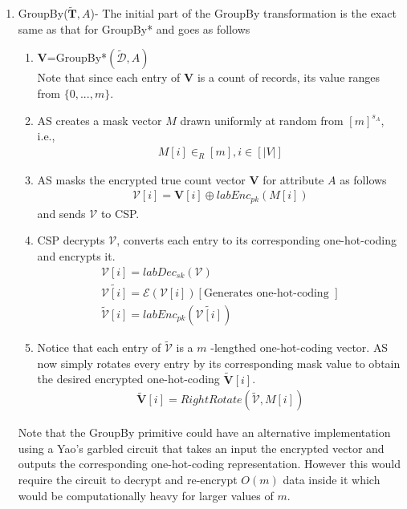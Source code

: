 \begin{enumerate}
\begin{enumerate}
\end{enumerate}
\item \textsf{GroupBy}($\mathbf{\tilde{T}},A$)- The initial part of the  \textsf{GroupBy} transformation is the exact same as that  for \textsf{GroupBy*} and goes as follows   \begin{enumerate}\item $\mathbf{V}$=\textsf{GroupBy*}$(\boldsymbol{\tilde{\mathcal{D}}},A)$ \\Note that since each entry of $\mathbf{V}$ is a count of records, its value ranges from $\{0,...,m\}$. \item \textsf{AS} creates a mask vector $M$ drawn uniformly at random from $[m]^{s_A}$, i.e.,  \begin{gather*} M[i] \in_R [m], i \in [|V|]\end{gather*} \item \textsf{AS} masks the encrypted true count vector $\mathbf{V}$ for attribute $A$ as follows \begin{gather*}\boldsymbol{\mathcal{V}}[i]= \mathbf{V}[i] \oplus labEnc_{pk}(M[i])\end{gather*} and sends $\boldsymbol{\mathcal{V}}$ to \textsf{CSP}.\item \textsf{CSP} decrypts $\boldsymbol{\mathcal{V}}$, converts each entry to its corresponding one-hot-coding and encrypts it. \begin{gather*}\mathcal{V}[i]=labDec_{sk}(\boldsymbol{\mathcal{V}})\\\tilde{\mathcal{V}[i]}=\mathcal{E}(\mathcal{V}[i])[\text{Generates one-hot-coding  }]\\\boldsymbol{\tilde{\mathcal{V}}}[i]=labEnc_{pk}(\tilde{\mathcal{V}[i]})\end{gather*}\item Notice that each entry of $\boldsymbol{\tilde{\mathcal{V}}}$ is a $m$ -lengthed one-hot-coding vector. \textsf{AS} now simply rotates every entry by its corresponding mask value to obtain the desired  encrypted one-hot-coding $\boldsymbol{\tilde{V}}[i]$. \begin{gather*}\boldsymbol{\tilde{V}}[i]=RightRotate(\boldsymbol{\tilde{\mathcal{V}}},M[i])\end{gather*}  \end{enumerate} Note that the \textsf{GroupBy} primitive could have an alternative implementation using a Yao's garbled circuit that takes an input the encrypted vector and outputs the corresponding one-hot-coding representation. However this would require the circuit to decrypt and re-encrypt $O(m)$ data inside it which would be computationally heavy for larger values of $m$. 

\end{enumerate}
